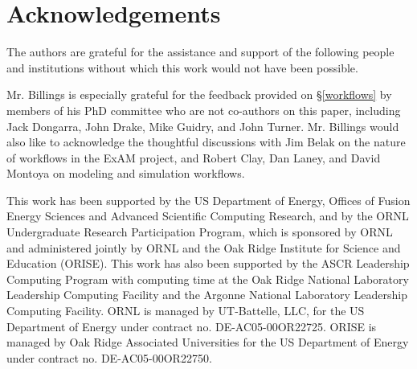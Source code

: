 \section{Acknowledgements}
The authors are grateful for the assistance and support of the following people
and institutions without which this work would not have been possible.

Mr. Billings is especially grateful for the feedback provided on \S\ref{workflows} by members of his PhD committee who are not co-authors on this paper, including Jack Dongarra, John Drake, Mike Guidry, and John Turner. Mr. Billings would also like to acknowledge the thoughtful discussions with Jim Belak on the nature of workflows in the ExAM project, and Robert Clay, Dan Laney, and David Montoya on modeling and simulation workflows.

This work has been supported by the US Department of Energy, Offices of Fusion
Energy Sciences and Advanced Scientific Computing Research, and by the ORNL
Undergraduate Research Participation Program, which is sponsored by ORNL and
administered jointly by ORNL and the Oak Ridge Institute for Science and
Education (ORISE). This work has also been supported by the ASCR Leadership
Computing Program with computing time at the Oak Ridge National Laboratory
Leadership Computing Facility and the Argonne National Laboratory Leadership
Computing Facility. ORNL is managed by UT-Battelle, LLC, for the US Department
of Energy under contract no. DE-AC05-00OR22725. ORISE is managed by Oak Ridge
Associated Universities for the US Department of Energy under contract no.
DE-AC05-00OR22750.
